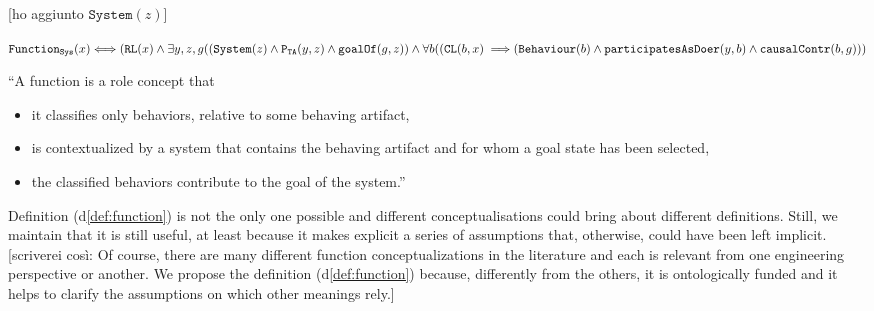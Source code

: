 \documentclass[sw]{iosart2x}
\newcommand{\bflist}{\begin{list}{}{\setlength{\topsep}{2mm}\setlength{\partopsep}{0mm}\setlength{\parsep}{0mm}\setlength{\leftmargin}{9mm}\setlength{\labelwidth}{8mm}}}
\newcommand{\eflist}{\end{list}}
\newcommand{\DefLabel}{\textrm{d}}
\newcounter{cntdef}
\newcommand{\mydf}[1]{\refstepcounter{cntdef}\begin{small}{\bf \DefLabel\thecntdef\label{def:#1}}\end{small}}
\newcommand{\refdf}[1]{({\DefLabel}\ref{#1})}
\newcommand{\generalStyle}[1]{\texttt{#1}}
\newcommand{\biRel}[3]{\generalStyle{#1}(#2,#3)}
\newcommand{\uniRel}[2]{\generalStyle{#1}(#2)}
\newcommand{\uniRelPar}[3]{\generalStyle{#1}_{\generalStyle{#3}}(#2)}
\newcommand{\biRelPar}[4]{\generalStyle{#1}_{\generalStyle{#4}}(#2,#3)}
\newcommand{\myiff}{\Longleftrightarrow}
\newcommand{\myfi}{\hspace{0.9mm} \Longrightarrow}
\newcommand{\DOLCERole}[1]{\uniRel{{RL}}{#1}}
\newcommand{\DOLCEPart}[2]{\biRel{{P}}{#1}{#2}}
\newcommand{\DOLCECLby}[2]{\biRel{CL}{#1}{#2}}
\newcommand{\BehaviourConcrete}[1]{\uniRel{Behaviour}{#1}}
\newcommand{\System}[1]{\uniRel{System}{#1}}
\newcommand{\FunctionSys}[1]{\uniRelPar{Function}{#1}{Sys}}
\newcommand{\contextOf}[2]{\biRel{contextOf}{#1}{#2}}
\newcommand{\causallyContr}[2]{\biRel{causalContr}{#1}{#2}}
\newcommand{\participateAsDoer}[2]{\biRel{participatesAsDoer}{#1}{#2}}
\newcommand{\goalOf}[2]{\biRel{goalOf}{#1}{#2}}
\newcommand{\partTA}[2]{\biRelPar{P}{#1}{#2}{TA}}
\newcommand{\TODO}[1]{{\color{red} #1}}
\begin{document}
{\TODO{[ho aggiunto $\System{z}$]}
\bflist
  


  \item[\mydf{function}] $ \FunctionSys{x} \myiff (\DOLCERole{x} \land 
  \exists y,z,g ((\System{z} \land \partTA{y}{z} \land \goalOf{g}{z}) \land \\
    \forall b ((\DOLCECLby{b}{x} \myfi (\BehaviourConcrete{b} \land 
      \participateAsDoer{y}{b} \land \causallyContr{b}{g}))  $
  \item [] {``A function is a role concept that 
  \begin{itemize}[topsep=0pt]
    \item it classifies only behaviors, relative to some behaving artifact, 
    \item is contextualized by a system that contains the behaving artifact and for whom a goal state has been selected, 
    \item the classified behaviors contribute to the goal of the system.'' %
  \end{itemize}}
\eflist

Definition \refdf{def:function} is not the only one possible and different conceptualisations could bring about different definitions.
Still, we maintain that it is still useful, at least because it makes explicit a series of assumptions that, otherwise, could have been left implicit.\TODO{[scriverei così: Of course, there are many different function conceptualizations in the literature and each is relevant from one engineering perspective or another. We propose the definition \refdf{def:function} because, differently from the others, it is ontologically funded and it helps to clarify the assumptions on which other meanings rely.]}
}
\end{document}
